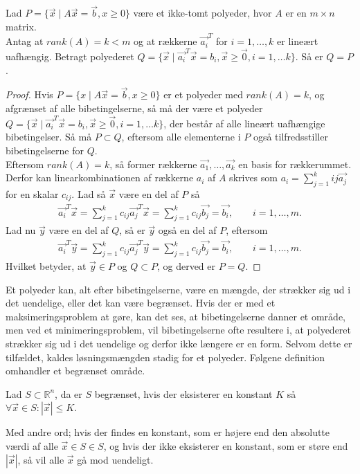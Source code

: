 \begin{stn} 
Lad $P=\{\vec{x}\mid A\vec{x}=\vec{b},x\geq 0\}$ være et ikke-tomt polyeder, hvor $A$ er en $m\times n$ matrix.\\
Antag at $rank(A)=k<m$ og at rækkerne $\vec{a_i}^T$ for $i=1,\dots ,k$ er lineært uafhængig. Betragt polyederet $Q=\{\vec{x}\mid \vec{a_i}^T\vec{x}=b_{i}, \vec{x}\geq \vec{0}, i = 1,\dots	k\}$. Så er $Q=P$.
\label{stn:PQ}
\end{stn}

\begin{proof}
Hvis $P=\{x\mid A\vec{x}=\vec{b},x\geq 0\}$ er et polyeder med $rank(A)=k$, og afgrænset af alle bibetingelserne, så må der være et polyeder $Q=\{\vec{x}\mid \vec{a_i}^T\vec{x}=b_{i}, \vec{x}\geq \vec{0}, i = 1,\dots	k\}$, der består af alle lineært uafhængige bibetingelser. Så må $P\subset Q$, eftersom alle elementerne i $P$ også tilfredsstiller bibetingelserne for $Q$.\\
Eftersom $rank(A)=k$, så former rækkerne $\vec{a_1},\dots ,\vec{a_k}$ en basis for rækkerummet. Derfor kan linearkombinationen af rækkerne $a_i$ af $A$ skrives som $a_i=\sum_{j=1}^{k}{i j}\vec{a_j}$ for en skalar $c_{i j}$. Lad så $\vec{x}$ være en del af $P$ så
\begin{align*}
\vec{a_i}^T\vec{x}=\sum_{j=1}^{k}c_{i j}\vec{a_j}^T\vec{x}=\sum_{j=1}^{k}c_{i j}\vec{b_j}=\vec{b_i}, \qquad i=1,\dots,m.
\end{align*}
Lad nu $\vec{y}$ være en del af $Q$, så er $\vec{y}$ også en del af $P$, eftersom
\begin{align*}
\vec{a_i}^T\vec{y}=\sum_{j=1}^{k}c_{i j}\vec{a_j}^T\vec{y}=\sum_{j=1}^{k}c_{i j}\vec{b_j}=\vec{b_i}, \qquad i=1,\dots,m.
\end{align*}
Hvilket betyder, at $\vec{y}\in P$ og $Q\subset P$, og derved er $P=Q$.
\end{proof}

Et polyeder kan, alt efter bibetingelserne, være en mængde, der strækker sig ud i det uendelige, eller det kan være begrænset. 
Hvis der er med et maksimeringsproblem at gøre, kan det ses, at bibetingelserne danner et område, men ved et minimeringsproblem, vil bibetingelserne ofte resultere i, at polyederet strækker sig ud i det uendelige og derfor ikke længere er en form. Selvom dette er tilfældet, kaldes løsningsmængden stadig for et polyeder.
Følgene definition omhandler et begrænset område.
\begin{defn} [Begrænset]
Lad $S \subset \mathds{R}^n$, da er $S$ begrænset, hvis der eksisterer en konstant $K$ så $\forall \vec{x} \in S: |\vec{x}| \leq K$.
\end{defn}
Med andre ord; hvis der findes en konstant, som er højere end den absolutte værdi af alle $\vec{x} \in S \in S$, og hvis der ikke eksisterer en konstant, som er støre end $|\vec{x}|$, så vil alle $\vec{x}$ gå mod uendeligt.

